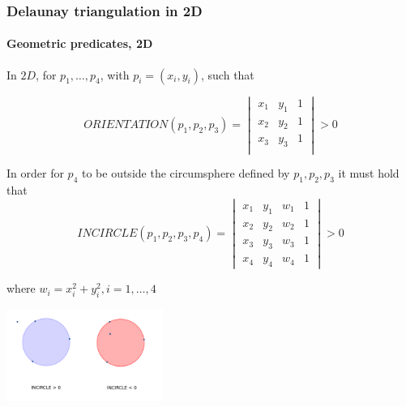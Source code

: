 \documentclass[c, 10pt]{beamer}
\begin{document}
\begin{frame}\frametitle{Delaunay triangulation in 2D}\framesubtitle{Geometric predicates, 2D}
\begin{small}
In $2D$, for $p_1, \dots, p_4$, with $p_i = (x_i, y_i)$, such that

$$ORIENTATION(p_1,p_2,p_3) = 
\begin{vmatrix} 
x_1 & y_1 & 1 \\
x_2 & y_2 & 1 \\
x_3 & y_3 & 1 \\
\end{vmatrix} > 0$$

In order for $p_4$ to be outside the circumsphere defined by $p_1,p_2,p_3$ it must hold that
$$INCIRCLE(p_1,p_2,p_3,p_4) = \begin{vmatrix} x_1 & y_1 & w_1 & 1 \\
x_2 & y_2 & w_2 & 1 \\
x_3 & y_3 &  w_3 & 1 \\
x_4 & y_4 &  w_4 & 1\end{vmatrix} > 0$$

where $w_i = x_i^2  + y_i^2, i = 1,\dots, 4$  

\end{small}

\begin{center}
\includegraphics[height = 3cm]{./FigureLayout/Incircle.png}
\end{center}

\end{frame}
\end{document}
